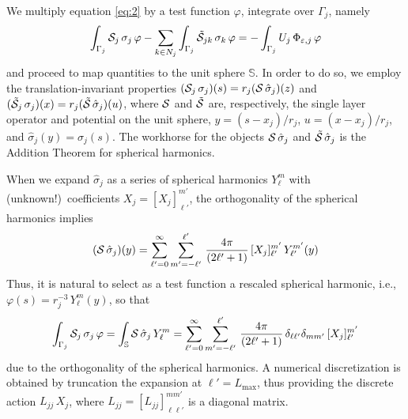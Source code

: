 We multiply equation \eqref{eq:2} by a test function $\varphi$, integrate over $\Gamma_j$, namely
\[
\int_{\Gamma_j} \mathcal{S}_j \, \sigma_j \, \varphi - \sum_{k \in N_j} \int_{\Gamma_j} \tilde{\mathcal{S}}_{jk} \, \sigma_k \, \varphi = -\int_{\Gamma_j} U_j \, \Phi_{\varepsilon,j} \, \varphi
\]
and proceed to map quantities to the unit sphere $\mathbb{S}$. In order to do so, we employ the translation-invariant properties $(\mathcal{S}_j \, \sigma_j)(s) = r_j( \mathcal{S} \, \hat{\sigma}_j)(z)$ and $(\tilde{\mathcal{S}}_j \, \sigma_j)(x) = r_j( \tilde{\mathcal{S}} \, \hat{\sigma}_j)(u)$, where $\mathcal{S}$ and $\tilde{\mathcal{S}}$ are, respectively, the single layer operator and potential on the unit sphere, $y = (s - x_j)/r_j$, $u = (x - x_j)/r_j$, and $\hat{\sigma}_j(y) = \sigma_j(s)$. The workhorse for the objects $\mathcal{S} \, \hat{\sigma}_j$ and $\tilde{\mathcal{S}} \, \hat{\sigma}_j$ is the Addition Theorem for spherical harmonics.

When we expand $\hat{\sigma}_j$ as a series of spherical harmonics $Y_\ell^m$ with (unknown!)~coefficients $X_j = [X_j]_{\ell'}^{m'}$, the orthogonality of the spherical harmonics implies
\[
(\mathcal{S} \, \hat{\sigma}_j)(y) = \sum_{\ell'= 0}^{\infty} \sum_{m' = -\ell'}^{\ell'} \, \frac{4\pi}{(2\ell' + 1)}\, [X_j]_{\ell'}^{m'} \, Y_{\ell'}^{m'}(y)
\]
Thus, it is natural to select as a test function a rescaled spherical harmonic, i.e., $\varphi(s) = r_j^{-3} \, Y_\ell^m(y)$, so that
\[
\int_{\Gamma_j} \mathcal{S}_j \, \sigma_j \, \varphi =  \int_\mathbb{S} \mathcal{S} \, \hat{\sigma}_j \, Y_\ell^m = \sum_{\ell'= 0}^{\infty} \sum_{m' = -\ell'}^{\ell'} \, \frac{4\pi}{(2\ell' + 1)} \, \delta_{\ell \ell'} \delta_{m m'}\, [X_j]_{\ell'}^{m'} 
\]
due to the orthogonality of the spherical harmonics. A numerical discretization is obtained by truncation the expansion at $\ell'=L_\text{max}$, thus providing the discrete action $L_{jj} \, X_j$, where $L_{jj} = [L_{jj}]_{\ell \ell'}^{m m'}$ is a diagonal matrix.

